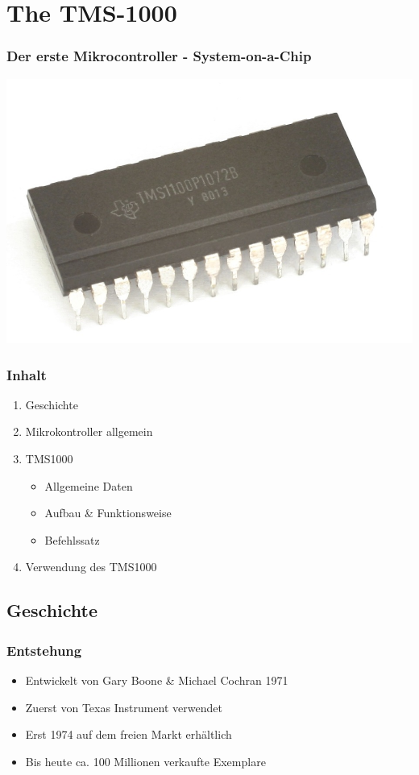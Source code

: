 \section{The TMS-1000}
\begin{frame}
	  \frametitle{Der erste Mikrocontroller - System-on-a-Chip}
	  \begin{center}

		\includegraphics[scale=0.25]{images/KL_TI_TMS1100.jpg}


	  \end{center}
\end{frame}


\begin{frame}
	\frametitle{Inhalt}
		\begin{enumerate}
			\item Geschichte \pause
			\item Mikrokontroller allgemein \pause
			\item TMS1000 \pause \begin{itemize}
										\item Allgemeine Daten \pause
										\item Aufbau \& Funktionsweise \pause
										\item Befehlssatz \pause
										\end{itemize}
			\item Verwendung des TMS1000
		\end{enumerate}
\end{frame}

\subsection{Geschichte}
\begin{frame}
	\frametitle{Entstehung}
		\begin{itemize}
			\item Entwickelt von Gary Boone \& Michael Cochran 1971 \pause
			\item Zuerst von Texas Instrument verwendet \pause
			\item Erst 1974 auf dem freien Markt erh{\"a}ltlich \pause
			\item Bis heute ca. 100 Millionen verkaufte Exemplare 
		\end{itemize}
\end{frame}

